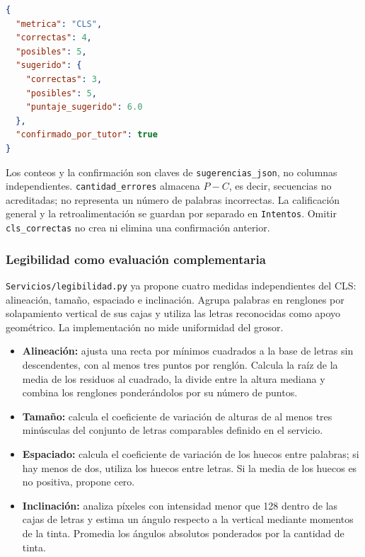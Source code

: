 \noindent\begin{minipage}{\linewidth}
\begin{lstlisting}[language=JSON, caption={Ejemplo de CLS confirmado en sugerencias\_json}, label={lst:ocr-output}]
{
  "metrica": "CLS",
  "correctas": 4,
  "posibles": 5,
  "sugerido": {
    "correctas": 3,
    "posibles": 5,
    "puntaje_sugerido": 6.0
  },
  "confirmado_por_tutor": true
}
\end{lstlisting}
\end{minipage}

Los conteos y la confirmación son claves de \texttt{sugerencias\_json}, no columnas independientes. \texttt{cantidad\_errores} almacena $P-C$, es decir, secuencias no acreditadas; no representa un número de palabras incorrectas. La calificación general y la retroalimentación se guardan por separado en \texttt{Intentos}. Omitir \texttt{cls\_correctas} no crea ni elimina una confirmación anterior.

\subsubsection{Legibilidad como evaluación complementaria}
\label{sec:preparacion-metricas}
\texttt{Servicios/legibilidad.py} ya propone cuatro medidas independientes del CLS: alineación, tamaño, espaciado e inclinación. Agrupa palabras en renglones por solapamiento vertical de sus cajas y utiliza las letras reconocidas como apoyo geométrico. La implementación no mide uniformidad del grosor.

\begin{itemize}
    \item \textbf{Alineación:} ajusta una recta por mínimos cuadrados a la base de letras sin descendentes, con al menos tres puntos por renglón. Calcula la raíz de la media de los residuos al cuadrado, la divide entre la altura mediana y combina los renglones ponderándolos por su número de puntos.
    \item \textbf{Tamaño:} calcula el coeficiente de variación de alturas de al menos tres minúsculas del conjunto de letras comparables definido en el servicio.
    \item \textbf{Espaciado:} calcula el coeficiente de variación de los huecos entre palabras; si hay menos de dos, utiliza los huecos entre letras. Si la media de los huecos es no positiva, propone cero.
    \item \textbf{Inclinación:} analiza píxeles con intensidad menor que 128 dentro de las cajas de letras y estima un ángulo respecto a la vertical mediante momentos de la tinta. Promedia los ángulos absolutos ponderados por la cantidad de tinta.
\end{itemize}

